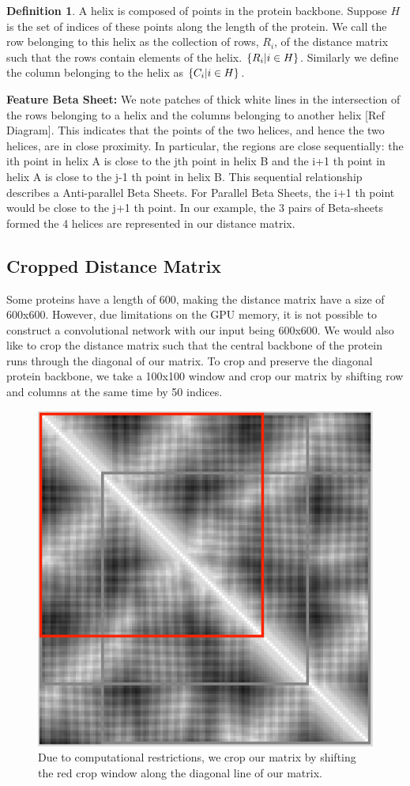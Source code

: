 \documentclass[12pt, a4paper, twocolumn, fullpage]{article}
\theoremstyle{plain}
\theoremstyle{definition}
\newtheorem{defn}{Definition}[section]
\theoremstyle{remark}
\begin{document}
\begin{defn}
A helix is composed of points in the protein backbone. Suppose $H$ is the set of indices of these points along the length of the protein. We call the row belonging to this helix as the collection of rows, $R_{i}$, of the distance matrix such that the rows contain elements of the helix. $\{R_{i} \space | \space i \in H \}$. Similarly we define the column belonging to the helix as $\{C_{i} \space | \space i \in H \}$.
\end{defn}

\noindent
\textbf{Feature Beta Sheet:}
We note patches of thick white lines in the intersection of the rows belonging to a helix and the columns belonging to another helix [Ref Diagram]. This indicates that the points of the two helices, and hence the two helices, are in close proximity. In particular, the regions are close sequentially: the ith point in helix A is close to the jth point in helix B and the i+1 th point in helix A is close to the j-1 th point in helix B. This sequential relationship describes a Anti-parallel Beta Sheets. For Parallel Beta Sheets, the i+1 th point would be close to the j+1 th point. In our example, the 3 pairs of Beta-sheets formed the 4 helices are represented in our distance matrix.
    
\subsection{ Cropped Distance Matrix}

Some proteins have a length of 600, making the distance matrix have a size of 600x600. However, due limitations on the GPU memory, it is not possible to construct a convolutional network with our input being 600x600. We would also like to crop the distance matrix such that the central backbone of the protein runs through the diagonal of our matrix. To crop and preserve the diagonal protein backbone, we take a 100x100 window and crop our matrix by shifting row and columns at the same time by 50 indices.

\begin{figure}[h]
    \centering
    \includegraphics[width=.7\linewidth]{cropMat}
    \caption{Due to computational restrictions, we crop our matrix by shifting the red crop window along the diagonal line of our matrix.}
    \label{cropMat}
\end{figure}
\end{document}
